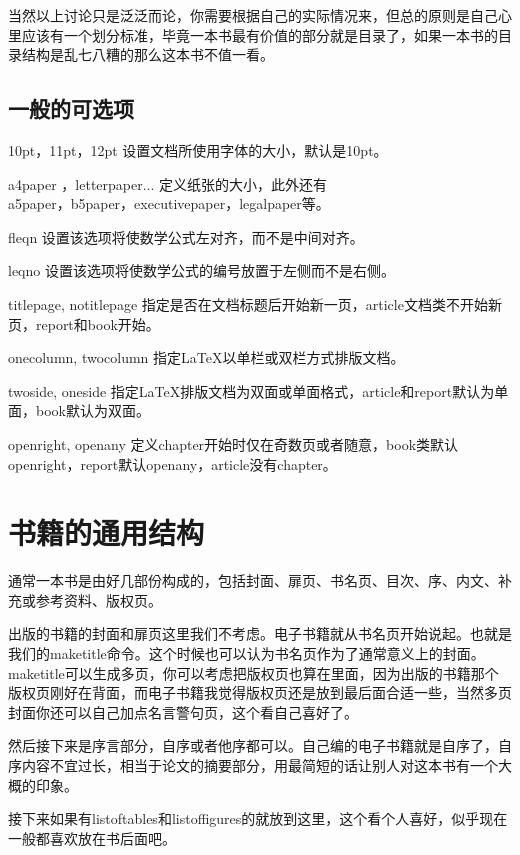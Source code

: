 \documentclass[11pt,oneside]{book}
\begin{document}
当然以上讨论只是泛泛而论，你需要根据自己的实际情况来，但总的原则是自己心里应该有一个划分标准，毕竟一本书最有价值的部分就是目录了，如果一本书的目录结构是乱七八糟的那么这本书不值一看。

\subsection{一般的可选项}
10pt，11pt，12pt      设置文档所使用字体的大小，默认是10pt\cite{wikibook-latex}\linebreak 。

a4paper ，letterpaper...      定义纸张的大小，此外还有\\a5paper，b5paper，executivepaper，legalpaper等。

fleqn       设置该选项将使数学公式左对齐，而不是中间对齐。

leqno       设置该选项将使数学公式的编号放置于左侧而不是右侧。

titlepage, notitlepage       指定是否在文档标题后开始新一页，article文档类不开始新页，report和book开始。

onecolumn, twocolumn       指定LaTeX以单栏或双栏方式排版文档。

twoside, oneside       指定LaTeX排版文档为双面或单面格式，article和report默认为单面，book默认为双面。

openright, openany       定义chapter开始时仅在奇数页或者随意，book类默认openright，report默认openany，article没有chapter。




\section{书籍的通用结构}
通常一本书是由好几部份构成的，包括封面、扉页、书名页、目次、序、内文、补充或参考资料、版权页。

出版的书籍的封面和扉页这里我们不考虑。电子书籍就从书名页开始说起。也就是我们的maketitle命令。这个时候也可以认为书名页作为了通常意义上的封面。maketitle可以生成多页，你可以考虑把版权页也算在里面，因为出版的书籍那个版权页刚好在背面，而电子书籍我觉得版权页还是放到最后面合适一些，当然多页封面你还可以自己加点名言警句页，这个看自己喜好了。

然后接下来是序言部分，自序或者他序都可以。自己编的电子书籍就是自序了，自序内容不宜过长，相当于论文的摘要部分，用最简短的话让别人对这本书有一个大概的印象。

接下来如果有listoftables和listoffigures的就放到这里，这个看个人喜好，似乎现在一般都喜欢放在书后面吧。
\end{document}
